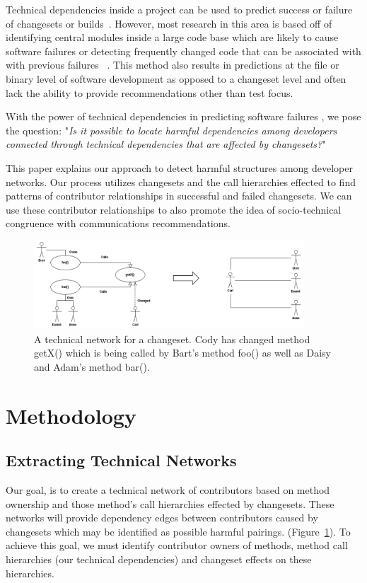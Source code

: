 \documentclass[conference]{IEEEtran}
\begin{document}
Technical dependencies inside a project can be used to predict success or failure of 
changesets or builds~\cite{Pinzger:2008:DNP, Zimmermann:2008:PDU}. However, most 
research in this area is based off of identifying
central modules inside a large code base which are likely to cause software failures or
detecting frequently changed code that can be associated with with previous failures
~\cite{Kim:2006:AIB}. 
This method also results in predictions 
at the file or binary level of software development as opposed to a changeset level
and often lack the ability to provide recommendations other than test focus.

With the power of technical dependencies in predicting software failures , we pose the question: 
"\textit{Is it possible to locate harmful dependencies among developers connected through 
technical dependencies that are affected by changesets?}"

This paper explains our approach to detect harmful structures among developer networks.
Our process utilizes changesets and the call hierarchies effected  to find patterns of contributor 
relationships in successful and failed changesets.  We can use these contributor relationships 
to also promote the idea of socio-technical congruence with communications recommendations.

\begin{figure}[tb!]
\centering
\includegraphics[width=0.9\textwidth]{images/TecNetwork}
\caption{A technical network for a changeset. Cody has changed method getX() which is being
called by Bart's method foo() as well as Daisy and Adam's method bar().\label{fig:network}}
\end{figure}

\section{Methodology}

\subsection{Extracting Technical Networks}
Our goal, is to create a technical network of contributors based on method ownership
and those method's call hierarchies effected by changesets. These networks will provide
dependency edges between contributors caused by changesets which may be 
identified as possible harmful pairings. (Figure~\ref{fig:network}). To achieve this goal,
we must identify contributor owners of methods, method call hierarchies (our technical
dependencies) and changeset effects on these hierarchies.
\end{document}
